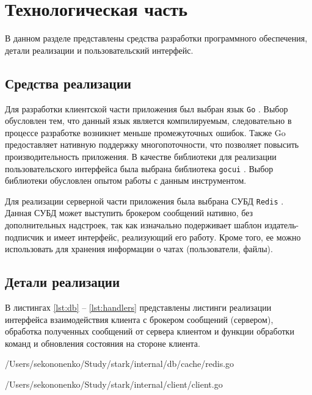 \chapter{Технологическая часть}

В данном разделе представлены средства разработки программного обеспечения, детали реализации и пользовательский интерфейс.

\section{Средства реализации}

Для разработки клиентской части приложения был выбран язык \texttt{Go} \cite{golang}. Выбор обусловлен тем, что данный язык является компилируемым, следовательно в процессе разработке возникнет меньше промежуточных ошибок. Также Go предоставляет нативную поддержку многопоточности, что позволяет повысить производительность приложения. В качестве библиотеки для реализации пользовательского интерфейса была выбрана библиотека \texttt{gocui} \cite{gocui}. Выбор библиотеки обусловлен опытом работы с данным инструментом.

Для реализации серверной части приложения была выбрана СУБД \texttt{Redis} \cite{redis}. Данная СУБД может выступить брокером сообщений нативно, без дополнительных надстроек, так как изначально подерживает шаблон издатель-подписчик \cite{redispubsub} и имеет интерфейс, реализующий его работу. Кроме того, ее можно использовать для хранения информации о чатах (пользователи, файлы).

\section{Детали реализации}

В листингах \ref{lst:db} -- \ref{lst:handlers} представлены листинги реализации интерфейса взаимодействия клиента с брокером сообщений (сервером), обработка полученных сообщений от сервера клиентом и функции обработки команд и обновления состояния на стороне клиента.

\begin{lstinputlisting}[
	caption={Реализация интерфейса взаимодействия клиента с брокером сообщений},
	label={lst:db},
	style={go},
	linerange={27-83},
	]{/Users/sekononenko/Study/stark/internal/db/cache/redis.go}
\end{lstinputlisting}

\begin{lstinputlisting}[
	caption={Обработка полученных сообщений от сервера клиентом},
	label={lst:client},
	style={go},
	linerange={83-287},
	]{/Users/sekononenko/Study/stark/internal/client/client.go}
\end{lstinputlisting}

